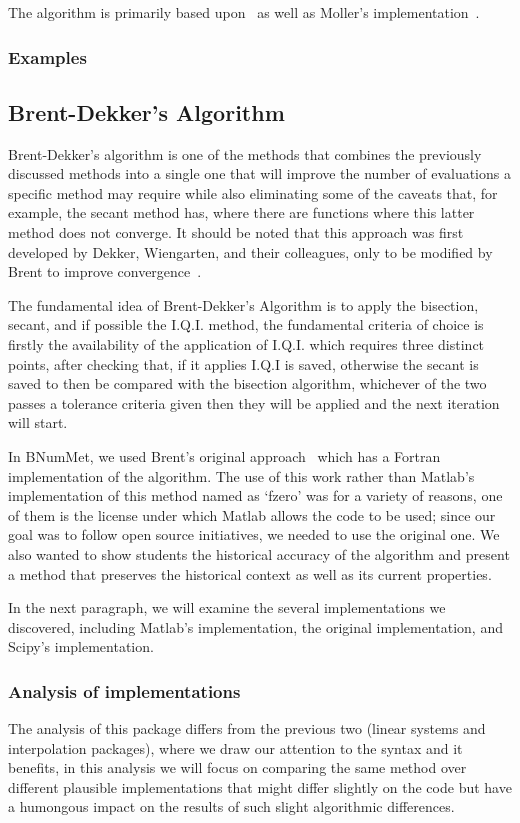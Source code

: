 The algorithm is primarily based upon~\cite{kreyszig11}  as well as Moller's implementation~\cite{doi:10.1137/1.9780898717952}.
\subsubsection{Examples}
	


\subsection{Brent-Dekker's Algorithm}
Brent-Dekker's algorithm is one of the methods that combines the previously discussed methods into a single one that will improve the number of evaluations a specific method may require while also eliminating some of the caveats that, for example, the secant method has, where there are functions where this latter method does not converge.  It should be noted that this approach was first developed by Dekker, Wiengarten, and their colleagues, only to be modified by Brent to improve convergence~\cite{brent2002algorithms}. 

The fundamental idea of Brent-Dekker's Algorithm is to apply the bisection, secant, and if possible the I.Q.I. method, the fundamental criteria of choice is firstly the availability of the application of I.Q.I. which requires three distinct points, after checking that, if it applies I.Q.I is saved, otherwise the secant is saved to then be compared with the bisection algorithm, whichever of the two passes a tolerance criteria given then they will be applied and the next iteration will start.


In BNumMet, we used Brent's original approach~\cite{Press2007} which has a Fortran implementation of the algorithm. The use of this work rather than Matlab's implementation of this method named as `fzero' was for a variety of reasons, one of them is the license under which Matlab allows the code to be used; since our goal was to follow open source initiatives, we needed to use the original one. We also wanted to show students the historical accuracy of the algorithm and present a method that preserves the historical context as well as its current properties. 

In the next paragraph, we will examine the several implementations we discovered, including Matlab's implementation, the original implementation, and Scipy's implementation.

\subsubsection{Analysis of implementations}
The analysis of this package differs from the previous two (linear systems and interpolation packages), where we draw our attention to the syntax and it benefits, in this analysis we will focus on comparing the same method over different plausible implementations that might differ slightly on the code but have a humongous impact on the results of such slight algorithmic differences.

